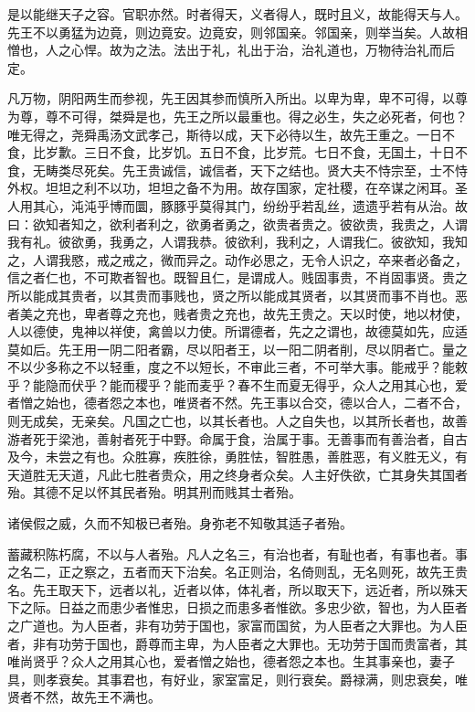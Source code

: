 \documentclass[]{article}
\begin{document}
是以能继天子之容。官职亦然。时者得天，义者得人，既时且义，故能得天与人。先王不以勇猛为边竟，则边竟安。边竟安，则邻国亲。邻国亲，则举当矣。人故相憎也，人之心悍。故为之法。法出于礼，礼出于治，治礼道也，万物待治礼而后定。

凡万物，阴阳两生而参视，先王因其参而慎所入所出。以卑为卑，卑不可得，以尊为尊，尊不可得，桀舜是也，先王之所以最重也。得之必生，失之必死者，何也？唯无得之，尧舜禹汤文武孝己，斯待以成，天下必待以生，故先王重之。一日不食，比岁歉。三日不食，比岁饥。五日不食，比岁荒。七日不食，无国土，十日不食，无畴类尽死矣。先王贵诚信，诚信者，天下之结也。贤大夫不恃宗至，士不恃外权。坦坦之利不以功，坦坦之备不为用。故存国家，定社稷，在卒谋之闲耳。圣人用其心，沌沌乎博而圜，豚豚乎莫得其门，纷纷乎若乱丝，遗遗乎若有从治。故曰：欲知者知之，欲利者利之，欲勇者勇之，欲贵者贵之。彼欲贵，我贵之，人谓我有礼。彼欲勇，我勇之，人谓我恭。彼欲利，我利之，人谓我仁。彼欲知，我知之，人谓我愍，戒之戒之，微而异之。动作必思之，无令人识之，卒来者必备之，信之者仁也，不可欺者智也。既智且仁，是谓成人。贱固事贵，不肖固事贤。贵之所以能成其贵者，以其贵而事贱也，贤之所以能成其贤者，以其贤而事不肖也。恶者美之充也，卑者尊之充也，贱者贵之充也，故先王贵之。天以时使，地以材使，人以德使，鬼神以祥使，禽兽以力使。所谓德者，先之之谓也，故德莫如先，应适莫如后。先王用一阴二阳者霸，尽以阳者王，以一阳二阴者削，尽以阴者亡。量之不以少多称之不以轻重，度之不以短长，不审此三者，不可举大事。能戒乎？能敕乎？能隐而伏乎？能而稷乎？能而麦乎？春不生而夏无得乎，众人之用其心也，爱者憎之始也，德者怨之本也，唯贤者不然。先王事以合交，德以合人，二者不合，则无成矣，无亲矣。凡国之亡也，以其长者也。人之自失也，以其所长者也，故善游者死于梁池，善射者死于中野。命属于食，治属于事。无善事而有善治者，自古及今，未尝之有也。众胜寡，疾胜徐，勇胜怯，智胜愚，善胜恶，有义胜无义，有天道胜无天道，凡此七胜者贵众，用之终身者众矣。人主好佚欲，亡其身失其国者殆。其德不足以怀其民者殆。明其刑而贱其士者殆。

诸侯假之威，久而不知极已者殆。身弥老不知敬其适子者殆。

蓄藏积陈朽腐，不以与人者殆。凡人之名三，有治也者，有耻也者，有事也者。事之名二，正之察之，五者而天下治矣。名正则治，名倚则乱，无名则死，故先王贵名。先王取天下，远者以礼，近者以体，体礼者，所以取天下，远近者，所以殊天下之际。日益之而患少者惟忠，日损之而患多者惟欲。多忠少欲，智也，为人臣者之广道也。为人臣者，非有功劳于国也，家富而国贫，为人臣者之大罪也。为人臣者，非有功劳于国也，爵尊而主卑，为人臣者之大罪也。无功劳于国而贵富者，其唯尚贤乎？众人之用其心也，爱者憎之始也，德者怨之本也。生其事亲也，妻子具，则孝衰矣。其事君也，有好业，家室富足，则行衰矣。爵禄满，则忠衰矣，唯贤者不然，故先王不满也。
\end{document}
